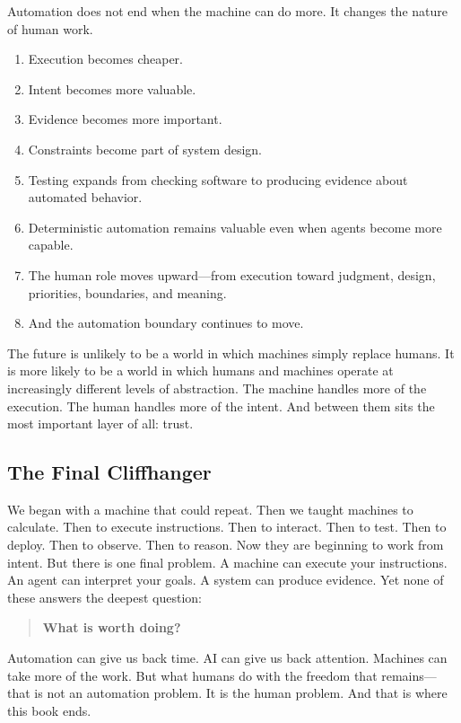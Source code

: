 \documentclass[11pt,twoside]{book}
\begin{document}
Automation does not end when the machine can do more.
It changes the nature of human work.
\begin{enumerate}[nosep]
    \item Execution becomes cheaper.
    \item Intent becomes more valuable.
    \item Evidence becomes more important.
    \item Constraints become part of system design.
    \item Testing expands from checking software to producing evidence about automated behavior.
    \item Deterministic automation remains valuable even when agents become more capable.
    \item The human role moves upward---from execution toward judgment, design, priorities, boundaries, and meaning.
    \item And the automation boundary continues to move.
\end{enumerate}
The future is unlikely to be a world in which machines simply replace humans.
It is more likely to be a world in which humans and machines operate at increasingly different levels of abstraction.
The machine handles more of the execution.
The human handles more of the intent.
And between them sits the most important layer of all: trust.

\subsection*{The Final Cliffhanger}

We began with a machine that could repeat.
Then we taught machines to calculate.
Then to execute instructions.
Then to interact.
Then to test.
Then to deploy.
Then to observe.
Then to reason.
Now they are beginning to work from intent.
But there is one final problem.
A machine can execute your instructions.
An agent can interpret your goals.
A system can produce evidence.
Yet none of these answers the deepest question:
\begin{quote}
\textbf{What is worth doing?}
\end{quote}
Automation can give us back time.
AI can give us back attention.
Machines can take more of the work.
But what humans do with the freedom that remains---
that is not an automation problem.
It is the human problem.
And that is where this book ends.
\end{document}
